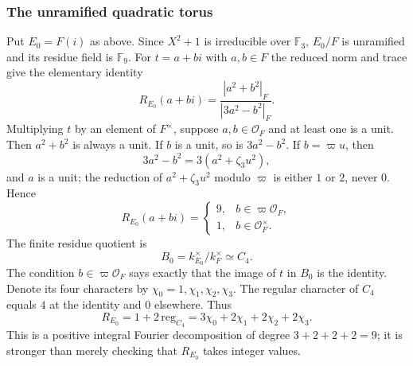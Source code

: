 \documentclass[11pt]{article}
\theoremstyle{plain}
\theoremstyle{definition}
\begin{document}
\subsubsection{The unramified quadratic torus}
Put $E_0=F(i)$ as above.  Since $X^2+1$ is irreducible over
$\mathbb F_3$, $E_0/F$ is unramified and its residue field is
$\mathbb F_9$.  For $t=a+bi$ with $a,b\in F$ the reduced norm
and trace give the elementary identity
\begin{equation}\label{eq:quadratic-R}
 R_{E_0}(a+bi)=
 \frac{|a^2+b^2|_F}{|3a^2-b^2|_F}.
\end{equation}
Multiplying $t$ by an element of $F^\times$, suppose
$a,b\in\mathcal O_F$ and at least one is a unit.
Then $a^2+b^2$ is always a unit.  If $b$ is a unit, so is
$3a^2-b^2$.  If $b=\varpi u$, then
\[
 3a^2-b^2=3(a^2+\zeta_3u^2),
\]
and $a$ is a unit; the reduction of $a^2+\zeta_3u^2$ modulo
$\varpi$ is either $1$ or $2$, never $0$.  Hence
\begin{equation}\label{eq:unram-values}
 R_{E_0}(a+bi)=
 \begin{cases}
 9,&b\in\varpi\mathcal O_F,\\
 1,&b\in\mathcal O_F^\times.
 \end{cases}
\end{equation}
The finite residue quotient is
\[
 B_0=k_{E_0}^\times/k_F^\times
 \simeq C_4.
\]
The condition $b\in\varpi\mathcal O_F$ says exactly that the
image of $t$ in $B_0$ is the identity.  Denote its four characters
by $\chi_0=1,\chi_1,\chi_2,\chi_3$.  The regular character of
$C_4$ equals $4$ at the identity and $0$ elsewhere. Thus
\begin{equation}\label{eq:unram-fourier}
 \boxed{\quad
 R_{E_0}=1+2\,\mathrm{reg}_{C_4}
 =3\chi_0+2\chi_1+2\chi_2+2\chi_3.
 \quad}
\end{equation}
This is a positive integral Fourier decomposition of degree
$3+2+2+2=9$; it is stronger than merely checking that
$R_{E_0}$ takes integer values.
\end{document}
